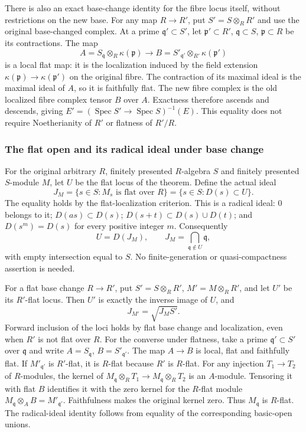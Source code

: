 There is also an exact base-change identity for the fibre locus itself, without restrictions on the new base. For any map \(R\to R'\), put \(S'=S\otimes_R R'\) and use the original base-changed complex. At a prime \(\mathfrak q'\subset S'\), let \(\mathfrak p'\subset R'\), \(\mathfrak q\subset S\), \(\mathfrak p\subset R\) be its contractions. The map \[
A=S_{\mathfrak q}\otimes_R\kappa(\mathfrak p)
\longrightarrow
B=S'_{\mathfrak q'}\otimes_{R'}\kappa(\mathfrak p')
\] is a local flat map: it is the localization induced by the field extension \(\kappa(\mathfrak p)\to\kappa(\mathfrak p')\) on the original fibre. The contraction of its maximal ideal is the maximal ideal of \(A\), so it is faithfully flat. The new fibre complex is the old localized fibre complex tensor \(B\) over \(A\). Exactness therefore ascends and descends, giving \(E'=(\operatorname{Spec}S'\to\operatorname{Spec}S)^{-1}(E)\). This equality does not require Noetherianity of \(R'\) or flatness of \(R'/R\).

\subsubsection{The flat open and its radical ideal under base change}\label{the-flat-open-and-its-radical-ideal-under-base-change}

For the original arbitrary \(R\), finitely presented \(R\)-algebra \(S\) and finitely presented \(S\)-module \(M\), let \(U\) be the flat locus of the theorem. Define the actual ideal \[
J_M=\{s\in S:M_s\text{ is flat over }R\}
    =\{s\in S:D(s)\subset U\}.
\] The equality holds by the flat-localization criterion. This is a radical ideal: \(0\) belongs to it; \(D(as)\subset D(s)\); \(D(s+t)\subset D(s)\cup D(t)\); and \(D(s^m)=D(s)\) for every positive integer \(m\). Consequently \[
U=D(J_M),\qquad
J_M=\bigcap_{\mathfrak q\notin U}\mathfrak q,
\] with empty intersection equal to \(S\). No finite-generation or quasi-compactness assertion is needed.

For a flat base change \(R\to R'\), put \(S'=S\otimes_R R'\), \(M'=M\otimes_R R'\), and let \(U'\) be its \(R'\)-flat locus. Then \(U'\) is exactly the inverse image of \(U\), and \[
J_{M'}=\sqrt{J_M S'}.
\] Forward inclusion of the loci holds by flat base change and localization, even when \(R'\) is not flat over \(R\). For the converse under flatness, take a prime \(\mathfrak q'\subset S'\) over \(\mathfrak q\) and write \(A=S_{\mathfrak q}\), \(B=S'_{\mathfrak q'}\). The map \(A\to B\) is local, flat and faithfully flat. If \(M'_{\mathfrak q'}\) is \(R'\)-flat, it is \(R\)-flat because \(R'\) is \(R\)-flat. For any injection \(T_1\to T_2\) of \(R\)-modules, the kernel of \(M_{\mathfrak q}\otimes_R T_1\to M_{\mathfrak q}\otimes_R T_2\) is an \(A\)-module. Tensoring it with flat \(B\) identifies it with the zero kernel for the \(R\)-flat module \(M_{\mathfrak q}\otimes_A B=M'_{\mathfrak q'}\). Faithfulness makes the original kernel zero. Thus \(M_{\mathfrak q}\) is \(R\)-flat. The radical-ideal identity follows from equality of the corresponding basic-open unions.


